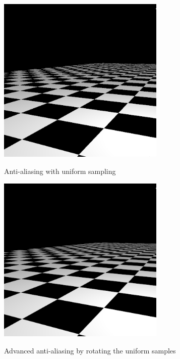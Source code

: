 \documentclass[acmtog]{acmart}
\begin{document}
\begin{figure}[h]
	\centering
	{\includegraphics[width=8cm]{result_u.png}}
	\caption{Anti-aliasing with uniform sampling}
\end{figure}

\begin{figure}[h]
	\centering
	{\includegraphics[width=8cm]{result_r.png}}
	\caption{Advanced anti-aliasing by rotating the uniform samples}
\end{figure}
\end{document}
